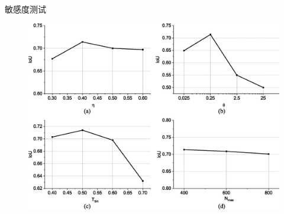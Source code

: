 \begin{frame}{敏感度测试}
\begin{figure}
    \centering
    \includegraphics[width=0.8\linewidth]{figures/composit1.eps}
\end{figure}
\end{frame}








